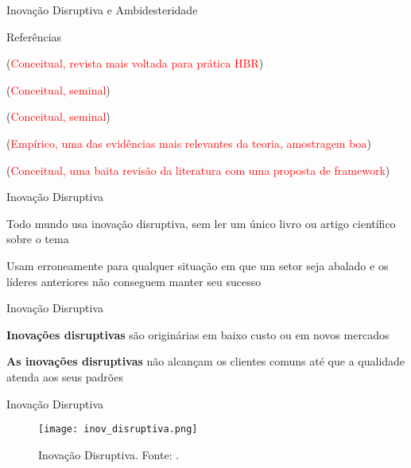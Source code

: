 \begin{frame}
	\centering
	\fontsize{22pt}{24pt}\selectfont
	Inovação Disruptiva e Ambidesteridade
\end{frame}

\begin{frame}{Referências}
    \begin{vfilleditems}
    \footnotesize
    \item {} (\textcolor{red}{Conceitual, revista mais voltada para prática HBR})
    \item {} (\textcolor{red}{Conceitual, seminal})
    \item {} (\textcolor{red}{Conceitual, seminal})
    \item {}
	    (\textcolor{red}{Empírico, uma das evidências mais relevantes da teoria, amostragem boa})
    \item {}
	    (\textcolor{red}{Conceitual, uma baita revisão da literatura com uma proposta de framework})
    \end{vfilleditems}
\end{frame}

\begin{frame}{Inovação Disruptiva}
    \begin{vfilleditems}
    \item Todo mundo usa inovação disruptiva, sem ler um único livro ou artigo científico sobre o tema
    \item Usam erroneamente para qualquer situação em que um setor seja abalado e os líderes anteriores não conseguem manter seu sucesso
    \end{vfilleditems}
\end{frame}

\begin{frame}{Inovação Disruptiva}
    \begin{vfilleditems}
    \item \textbf{Inovações disruptivas} são originárias em baixo custo ou em novos mercados
    \item \textbf{As inovações disruptivas} não alcançam os clientes comuns até que a qualidade atenda aos seus padrões
    \end{vfilleditems}
\end{frame}

\begin{frame}{Inovação Disruptiva}
	\centering
	\begin{figure}
	\texttt{[image: inov\_disruptiva.png]}
	\caption{Inovação Disruptiva. Fonte: \textcite{christensen2015disruptive}.}
	\label{fig:inov_disruptiva}
	\end{figure}
\end{frame}

